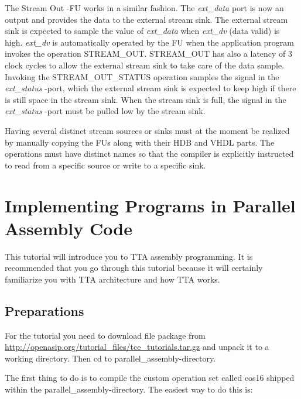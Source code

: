 \documentclass[a4paper,twoside]{tceusermanual}
\begin{document}
The Stream Out -FU works in a similar fashion. The \textit{ext\_data} port is now 
an output and provides the data to the external stream sink. The external stream
sink is expected to sample the value of \textit{ext\_data} when \textit{ext\_dv}
(data valid) is high. \textit{ext\_dv} is automatically operated by the FU when
the application program invokes the operation STREAM\_OUT. STREAM\_OUT has also
a latency of 3 clock cycles to allow the external stream sink to take care of the
data sample. Invoking the STREAM\_OUT\_STATUS operation samples the signal in
the \textit{ext\_status} -port, which the external stream sink is expected to keep
high if there is still space in the stream sink. When the stream sink is full, the
signal in the \textit{ext\_status} -port must be pulled low by the stream sink.

Having several distinct stream sources or sinks must at the moment be realized
by manually copying the FUs along with their HDB and VHDL parts. The operations
must have distinct names so that the compiler is explicitly instructed to read
from a specific source or write to a specific sink.

\section{Implementing Programs in Parallel Assembly Code}
\label{section:parallelAssemblyCoding}

This tutorial will introduce you to TTA assembly programming. It is
recommended that you go through this tutorial because it will certainly
familiarize you with TTA architecture and how TTA works.

\subsection{Preparations}

For the tutorial you need to download file package from
\url{http://openasip.org/tutorial_files/tce_tutorials.tar.gz} and unpack it
to a working directory. Then cd to parallel\_assembly-directory.

The first thing to do is to compile the custom operation set called cos16 shipped
within the parallel\_assembly-directory. The easiest way to do this is:

\end{document}
